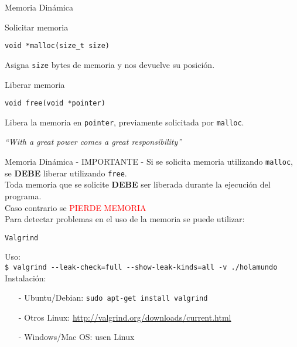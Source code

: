 \documentclass[aspectratio=169]{beamer}
\begin{document}
\begin{frame}[t]{Memoria Dinámica}
    \begin{block}{Solicitar memoria}
    \begin{center}
    \textcolor{verdeuca}{\texttt{void *malloc(size\_t size)}}\\
    \end{center}
    Asigna \texttt{size} bytes de memoria y nos devuelve su posición.
    \end{block}
    \vspace{0.5cm}
    \pause
    \begin{block}{Liberar memoria}
    \begin{center}
    \textcolor{verdeuca}{\texttt{void free(void *pointer)}}\\
    \end{center}
    Libera la memoria en \texttt{pointer}, previamente solicitada por \texttt{malloc}.
    \end{block}
    \pause
    \vspace{0.3cm}
    \begin{center}
    \textit{``With a great power comes a great responsibility''} 
    \end{center}
\end{frame}

\begin{frame}[fragile,t]{Memoria Dinámica  \hspace{0.5cm}\huge - IMPORTANTE -}
    \normalsize
    Si se solicita memoria utilizando \texttt{malloc}, se \textbf{DEBE} liberar utilizando \texttt{free}.\\
    Toda memoria que se solicite \textbf{DEBE} ser liberada durante la ejecución del programa.\\
    \vspace{0.3cm}
    \pause
    Caso contrario se \hspace{0.03cm} \huge \textcolor{red}{PIERDE MEMORIA} \\
    \vspace{0.3cm}
    \pause
    \normalsize Para detectar problemas en el uso de la memoria se puede utilizar: \\
    \begin{center}
    \Huge \texttt{Valgrind}\\
    \end{center}
    \pause
    \normalsize \textcolor{verdeuca}{Uso:}\\
    \normalsize \verb|$ valgrind --leak-check=full --show-leak-kinds=all -v ./holamundo|\\
    \vspace{0.2cm}
    \normalsize \textcolor{verdeuca}{Instalación:}\\
    \begin{itemize}
    \item[-] Ubuntu/Debian: \texttt{sudo apt-get install valgrind}
    \item[-] Otros Linux: \url{http://valgrind.org/downloads/current.html}
    \item[-] Windows/Mac OS: \textcolor{naranjauca}{usen Linux}
    \end{itemize}
\end{frame}
\end{document}
